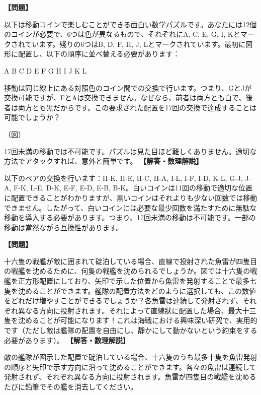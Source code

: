 \documentclass[10pt,a4paper,oneside,openany]{ltjsbook}
\begin{document}
\begin{tcolorbox}[colback=softblue,colframe=primaryblue,title=\textbf{第 234 問：交換パズル （原題: THE EXCHANGE PUZZLE.）},arc=2mm,boxrule=1pt,breakable]
\textbf{【問題】}\par\vspace{0.3em}
以下は移動コインで楽しむことができる面白い数学パズルです。あなたには12個のコインが必要で、6つは色が異なるもので、それぞれにA, C, E, G, I, Kとマークされています。殘りの6つはB, D, F, H, J, Lとマークされています。最初に図形に配置し、以下の順序に並べ替える必要があります：

    A   B   C   D
    E   F   G   H
    I   J   K   L

移動は同じ線上にある対照色のコイン間での交換で行います。つまり、GとJが交換可能ですが、FとAは交換できません。なぜなら、前者は両方とも白で、後者は両方とも黒だからです。この要求された配置を17回の交換で達成することは可能でしょうか？

（図）

17回未満の移動では不可能です。パズルは見た目ほど難しくありません。適切な方法でアタックすれば、意外と簡単です。
\tcblower
\textbf{【解答・数理解説】}\par\vspace{0.3em}
以下のペアの交換を行います：H-K, H-E, H-C, H-A, I-L, I-F, I-D, K-L, G-J, J-A, F-K, L-E, D-K, E-F, E-D, E-B, B-K。白いコインは11回の移動で適切な位置に配置できることがわかりますが、黒いコインはそれよりも少ない回数では移動できません。したがって、白いコインには必要な最少回数を満たすために無駄な移動を導入する必要があります。つまり、17回未満の移動は不可能です。一部の移動は當然ながら互換性があります。
\end{tcolorbox}

\begin{tcolorbox}[colback=softblue,colframe=primaryblue,title=\textbf{第 235 問：魚雷練習 （原題: TORPEDO PRACTICE.）},arc=2mm,boxrule=1pt,breakable]
\textbf{【問題】}\par\vspace{0.3em}
十六隻の戦艦が敵に囲まれて碇泊している場合、直線で投射された魚雷が四隻目の戦艦を沈めるために、何隻の戦艦を沈められるでしょうか。図では十六隻の戦艦を正方形配置にしており、矢印で示した位置から魚雷を発射することで最多七隻を沈めることができます。艦隊の配置方法をどのように選択しても、この数値をどれだけ増やすことができるでしょうか？各魚雷は連続して発射されず、それぞれ異なる方向に投射されます。それによって直線狀に配置した場合、最大十三隻を沈めることが可能になります！これは海戦における興味深い研究で、実用的です（ただし敵は艦隊の配置を自由にし、靜かにして動かないという約束をする必要があります）。
\tcblower
\textbf{【解答・数理解説】}\par\vspace{0.3em}
敵の艦隊が図示した配置で碇泊している場合、十六隻のうち最多十隻を魚雷発射の順序と矢印で示す方向に沿って沈めることができます。各々の魚雷は連続して発射されず、それぞれ異なる方向に投射されます。魚雷が四隻目の戦艦を沈めるたびに鉛筆でその艦を消去してください。
\end{tcolorbox}
\end{document}
